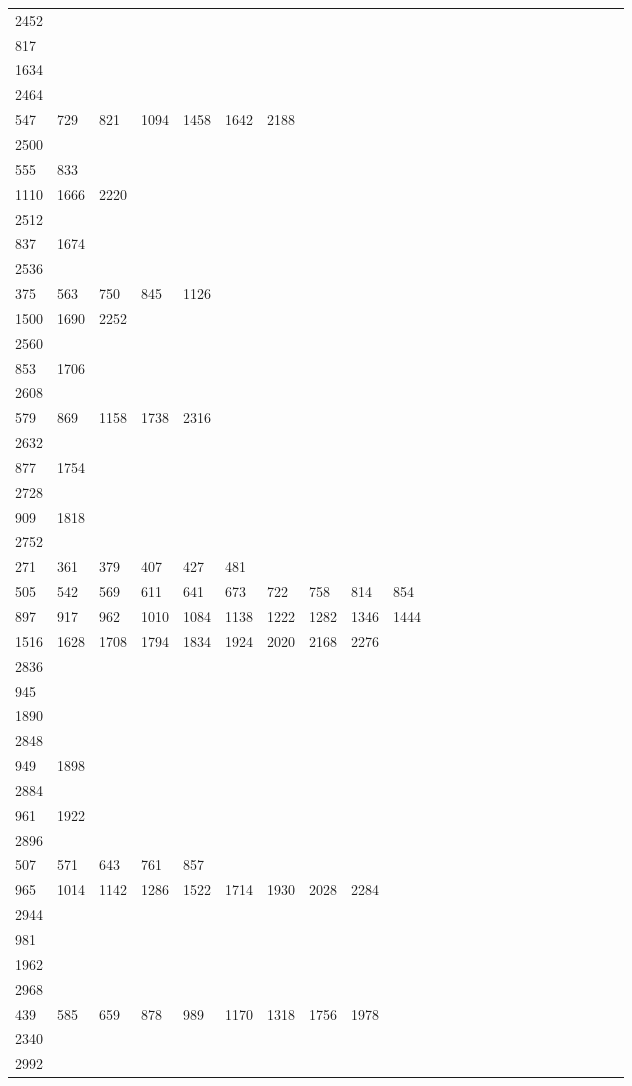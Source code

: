 \begin{longtable}{*{24}{l}}
2452&&&&&&&&&\\
817\\
1634& \\
2464&&&&&&&&&\\
547& 729& 821& 1094& 1458& 1642& 2188& \\
2500&&&&&&&&&\\
555& 833\\
1110& 1666& 2220& \\
2512&&&&&&&&&\\
837& 1674& \\
2536&&&&&&&&&\\
375& 563& 750& 845& 1126\\
1500& 1690& 2252& \\
2560&&&&&&&&&\\
853& 1706& \\
2608&&&&&&&&&\\
579& 869& 1158& 1738& 2316\\
2632&&&&&&&&&\\
877& 1754& \\
2728&&&&&&&&&\\
909& 1818& \\
2752&&&&&&&&&\\
271& 361& 379& 407& 427& 481\\
505& 542& 569& 611& 641& 673& 722& 758& 814& 854\\
897& 917& 962& 1010& 1084& 1138& 1222& 1282& 1346& 1444\\
1516& 1628& 1708& 1794& 1834& 1924& 2020& 2168& 2276& \\
2836&&&&&&&&&\\
945\\
1890& \\
2848&&&&&&&&&\\
949& 1898& \\
2884&&&&&&&&&\\
961& 1922& \\
2896&&&&&&&&&\\
507& 571& 643& 761& 857\\
965& 1014& 1142& 1286& 1522& 1714& 1930& 2028& 2284& \\
2944&&&&&&&&&\\
981\\
1962& \\
2968&&&&&&&&&\\
439& 585& 659& 878& 989& 1170& 1318& 1756& 1978\\
2340& \\
2992&&&&&&&&&\\

\end{longtable}
